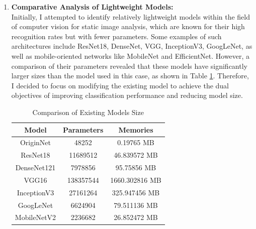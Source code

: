 \documentclass[conference]{IEEEtran}
\begin{document}
\begin{enumerate}
		\item \textbf{Comparative Analysis of Lightweight Models: }\\
		Initially, I attempted to identify relatively lightweight models within the field of computer vision for static image analysis, which are known for their high recognition rates but with fewer parameters. Some examples of such architectures include ResNet18, DenseNet, VGG, InceptionV3, GoogLeNet, as well as mobile-oriented networks like MobileNet and EfficientNet. However, a comparison of their parameters revealed that these models have significantly larger sizes than the model used in this case, as shown in Table \ref{tab:models_size}. Therefore, I decided to focus on modifying the existing model to achieve the dual objectives of improving classification performance and reducing model size.
		
		\begin{table}[h]
			\centering
			\begin{tabular}{|c|c|c|}
				\hline
				\textbf{Model} & \textbf{Parameters} & \textbf{Memories} \\ \hline
				OriginNet      & 48252                & 0.19765 MB        \\ \hline
				ResNet18 \cite{b1}       & 11689512           & 46.839572 MB     \\ \hline
				DenseNet121 \cite{b2}    & 7978856            & 95.75856 MB      \\ \hline
				VGG16 \cite{b3}          & 138357544          & 1660.302816 MB   \\ \hline
				InceptionV3 \cite{b4}    & 27161264           & 325.947456 MB    \\ \hline
				GoogLeNet \cite{b5}      & 6624904            & 79.511136 MB     \\ \hline
				MobileNetV2 \cite{b6}    & 2236682            & 26.852472 MB     \\ \hline
			\end{tabular}
			\caption{Comparison of Existing Models Size}
			\label{tab:models_size}
		\end{table}
		
	\end{enumerate}
\end{document}
